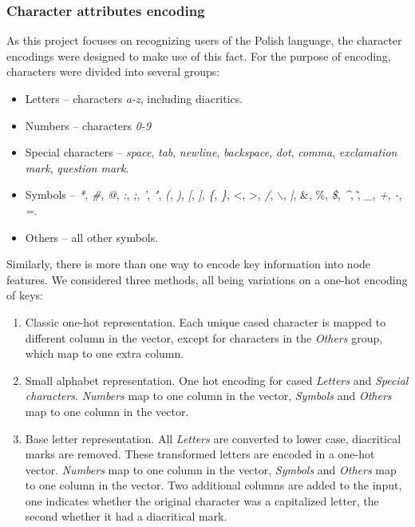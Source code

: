 \subsubsection{Character attributes encoding}
As this project focuses on recognizing users of the Polish language, the character encodings were designed to make use of this fact. For the purpose of encoding, characters were divided into several groups:\\
\begin{itemize}
	\item Letters -- characters \textit{a-z}, including diacritics.
	\item Numbers -- characters \textit{0-9}
	\item Special characters -- \textit{space}, \textit{tab}, \textit{newline}, \textit{backspace}, \textit{dot}, \textit{comma}, \textit{exclamation mark}, \textit{question mark}.
	\item Symbols -- \textit{*}, \textit{\#}, \textit{@}, \textit{:}, \textit{;},   \textit{'}, \textit{"}, \textit{(}, \textit{)}, \textit{[}, \textit{]}, \textit{\{}, \textit{\}}, \textless, \textgreater, \textit{/}, \textit{$\backslash$}, \textit{|}, \&, \%, \textit{\$}, \textit{\^}, \~, \textit{\_}, \textit{+}, \textit{-}, \textit{=}. 
	\item Others -- all other symbols.
\end{itemize}
Similarly, there is more than one way to encode key information into node features.
We considered three methods, all being variations on a one-hot encoding of keys:
\begin{enumerate}
	\item Classic one-hot representation. Each unique cased character is mapped to different column in the vector, except for characters in the \textit{Others} group, which map to one extra column.
	\item Small alphabet representation. One hot encoding for cased \textit{Letters} and \textit{Special characters}. \textit{Numbers} map to one column in the vector, \textit{Symbols} and \textit{Others} map to one column in the vector.
	\item Base letter representation. All \textit{Letters} are converted to lower case, diacritical marks are removed. These transformed letters are encoded in a one-hot vector. \textit{Numbers} map to one column in the vector, \textit{Symbols} and \textit{Others} map to one column in the vector. Two additional columns are added to the input, one indicates whether the original character was a capitalized letter, the second whether it had a diacritical mark.
\end{enumerate}

